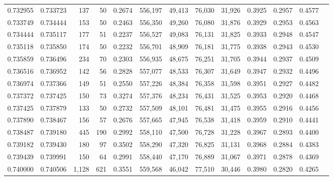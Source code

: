 \begin{tabular}{rrrrrrrrrrrrr}
0.732955 & 0.733723 &   137 &  50 &                                     0.2674 & 556,197 &  49,413 &  76,030 &  31,926 & 0.3925 & 0.2957 & 0.4577 \\
0.733749 & 0.734444 &   153 &  50 &                                     0.2463 & 556,350 &  49,260 &  76,080 &  31,876 & 0.3929 & 0.2953 & 0.4563 \\
0.734444 & 0.735117 &   177 &  51 &                                     0.2237 & 556,527 &  49,083 &  76,131 &  31,825 & 0.3933 & 0.2948 & 0.4547 \\
0.735118 & 0.735850 &   174 &  50 &                                     0.2232 & 556,701 &  48,909 &  76,181 &  31,775 & 0.3938 & 0.2943 & 0.4530 \\
0.735859 & 0.736496 &   234 &  70 &                                     0.2303 & 556,935 &  48,675 &  76,251 &  31,705 & 0.3944 & 0.2937 & 0.4509 \\
0.736516 & 0.736952 &   142 &  56 &                                     0.2828 & 557,077 &  48,533 &  76,307 &  31,649 & 0.3947 & 0.2932 & 0.4496 \\
0.736974 & 0.737366 &   149 &  51 &                                     0.2550 & 557,226 &  48,384 &  76,358 &  31,598 & 0.3951 & 0.2927 & 0.4482 \\
0.737372 & 0.737425 &   150 &  73 &                                     0.3274 & 557,376 &  48,234 &  76,431 &  31,525 & 0.3953 & 0.2920 & 0.4468 \\
0.737425 & 0.737879 &   133 &  50 &                                     0.2732 & 557,509 &  48,101 &  76,481 &  31,475 & 0.3955 & 0.2916 & 0.4456 \\
0.737890 & 0.738467 &   156 &  57 &                                     0.2676 & 557,665 &  47,945 &  76,538 &  31,418 & 0.3959 & 0.2910 & 0.4441 \\
0.738487 & 0.739180 &   445 & 190 &                                     0.2992 & 558,110 &  47,500 &  76,728 &  31,228 & 0.3967 & 0.2893 & 0.4400 \\
0.739182 & 0.739430 &   180 &  97 &                                     0.3502 & 558,290 &  47,320 &  76,825 &  31,131 & 0.3968 & 0.2884 & 0.4383 \\
0.739439 & 0.739991 &   150 &  64 &                                     0.2991 & 558,440 &  47,170 &  76,889 &  31,067 & 0.3971 & 0.2878 & 0.4369 \\
0.740000 & 0.740506 & 1,128 & 621 &                                     0.3551 & 559,568 &  46,042 &  77,510 &  30,446 & 0.3980 & 0.2820 & 0.4265 \\

\end{tabular}
